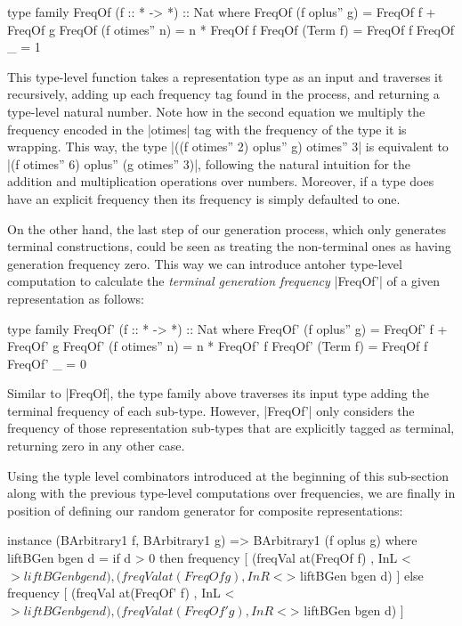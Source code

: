 \begin{code}
type family FreqOf (f :: * -> *) :: Nat where
  FreqOf (f oplus'' g)   = FreqOf f + FreqOf g
  FreqOf (f otimes'' n)  = n * FreqOf f
  FreqOf (Term f)        = FreqOf f
  FreqOf _               = 1
\end{code}

This type-level function takes a representation type as an input and traverses
it recursively, adding up each frequency tag found in the process, and returning
a type-level natural number.
%
Note how in the second equation we multiply the frequency encoded in the
|otimes| tag with the frequency of the type it is wrapping.
%
This way, the type |((f otimes'' 2) oplus'' g) otimes'' 3| is equivalent to |(f
otimes'' 6) oplus'' (g otimes'' 3)|, following the natural intuition for the
addition and multiplication operations over numbers.
%
Moreover, if a type does have an explicit frequency then its frequency is simply
defaulted to one.


On the other hand, the last step of our generation process, which only generates
terminal constructions, could be seen as treating the non-terminal ones as
having generation frequency zero.
%
This way we can introduce antoher type-level computation to calculate the
\emph{terminal generation frequency} |FreqOf'| of a given representation as
follows:

\begin{code}
type family FreqOf' (f :: * -> *) :: Nat where
  FreqOf' (f oplus'' g)   = FreqOf' f  +  FreqOf' g
  FreqOf' (f otimes'' n)  = n  *  FreqOf' f
  FreqOf' (Term f)        = FreqOf f
  FreqOf' _               = 0
\end{code}

Similar to |FreqOf|, the type family above traverses its input type adding the
terminal frequency of each sub-type.
%
However, |FreqOf'| only considers the frequency of those representation
sub-types that are explicitly tagged as terminal, returning zero in any other
case.


Using the typle level combinators introduced at the beginning of this
sub-section along with the previous type-level computations over frequencies, we
are finally in position of defining our random generator for composite
representations:

\begin{code}
instance (BArbitrary1 f, BArbitrary1 g)
  => BArbitrary1 (f oplus g) where
  liftBGen bgen d =
    if d > 0
    then frequency
      [ (freqVal  at(FreqOf f) ,  InL <$> liftBGen bgen d)
      , (freqVal  at(FreqOf g) ,  InR <$> liftBGen bgen d) ]
    else frequency
      [ (freqVal  at(FreqOf' f) ,  InL <$> liftBGen bgen d)
      , (freqVal  at(FreqOf' g) ,  InR <$> liftBGen bgen d) ]
\end{code}

